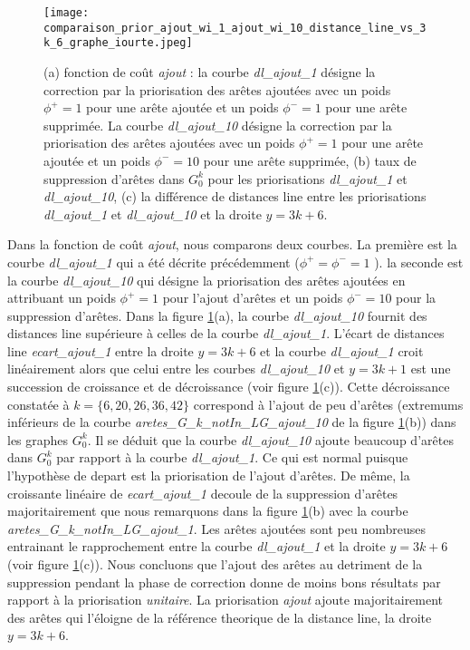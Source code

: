 \begin{figure}[htb!] 
\centering
\texttt{[image: comparaison\_prior\_ajout\_wi\_1\_ajout\_wi\_10\_distance\_line\_vs\_3k\_6\_graphe\_iourte.jpeg]}
\caption{  (a) fonction de co\^ut {\em ajout} : la courbe {\em dl\_ajout\_1} d\'esigne la correction par la priorisation des ar\^etes ajout\'ees avec un poids $\phi^{+} = 1$  pour une ar\^ete ajout\'ee et un poids $\phi^{-} = 1$  pour une ar\^ete supprim\'ee.
 La courbe {\em dl\_ajout\_10} d\'esigne la correction par la priorisation des ar\^etes ajout\'ees avec un poids $\phi^{+} = 1$  pour une ar\^ete ajout\'ee et un poids $\phi^{-} = 10$  pour une ar\^ete supprim\'ee,
 (b) taux de suppression d'ar\^etes dans  $G_0^k$ pour les priorisations  {\em dl\_ajout\_1} et  {\em dl\_ajout\_10},
(c) la diff\'erence de distances line entre les priorisations {\em dl\_ajout\_1} et  {\em dl\_ajout\_10}  et la droite $y=3k+6$. }
\label{priorAjout1Ajout10} 
\end{figure}

Dans la fonction de co\^ut {\em ajout}, nous comparons deux courbes. La premi\`ere est la courbe {\em dl\_ajout\_1} qui a \'et\'e d\'ecrite pr\'ec\'edemment ($\phi^{+} = \phi^{-} = 1$ ). la seconde est la courbe {\em dl\_ajout\_10} qui d\'esigne la priorisation des ar\^etes ajout\'ees en attribuant un poids $\phi^{+} = 1$ pour l'ajout d'ar\^etes et un poids $\phi^{-} = 10$ pour la suppression d'ar\^etes.
\newline
Dans la figure \ref{priorAjout1Ajout10}(a), la courbe {\em dl\_ajout\_10} fournit des distances line sup\'erieure \`a celles de la courbe  {\em dl\_ajout\_1}. L'\'ecart de distances line {\em ecart\_ajout\_1} entre la droite $y = 3k + 6 $ et la courbe {\em dl\_ajout\_1} croit lin\'eairement alors que celui entre les courbes {\em dl\_ajout\_10} et $y = 3k + 1 $ est une succession de croissance et de d\'ecroissance (voir figure \ref{priorAjout1Ajout10}(c)). 
Cette d\'ecroissance constat\'ee \`a $k=\{6,20,26,36,42\}$ correspond \`a l'ajout de peu d'ar\^etes (extremums inf\'erieurs de la courbe {\em aretes\_G\_k\_notIn\_LG\_ajout\_10} de la figure \ref{priorAjout1Ajout10}(b)) dans les graphes $G_0^k$.
 Il se d\'eduit que la courbe {\em dl\_ajout\_10} ajoute beaucoup d'ar\^etes dans $G_0^k$ par rapport \`a la courbe  {\em dl\_ajout\_1}. 
Ce qui est normal puisque l'hypoth\`ese de depart est la priorisation de l'ajout d'ar\^etes.
De m\^eme, la croissante lin\'eaire de {\em ecart\_ajout\_1} decoule de la suppression d'ar\^etes majoritairement que nous remarquons dans la figure \ref{priorAjout1Ajout10}(b) avec la courbe {\em aretes\_G\_k\_notIn\_LG\_ajout\_1}. Les ar\^etes ajout\'ees sont peu nombreuses entrainant le rapprochement entre la courbe {\em dl\_ajout\_1} et la droite $y = 3k +6$ (voir figure \ref{priorAjout1Ajout10}(c)).
\newline
Nous concluons que l'ajout des ar\^etes au detriment de la suppression pendant la phase de correction donne de moins bons r\'esultats par rapport \`a la priorisation {\em unitaire}. La priorisation {\em ajout} ajoute majoritairement des ar\^etes qui l'\'eloigne de la r\'ef\'erence theorique de la distance line, la droite $y = 3k+6$.

